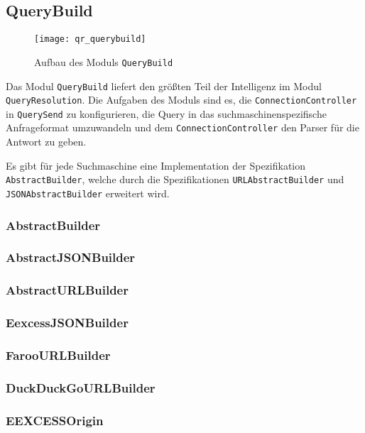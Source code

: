 
\subsection{QueryBuild}

\begin{figure}[htb]
  \texttt{[image: qr\_querybuild]}
  \caption{Aufbau des Moduls \lstinline|QueryBuild|}
\end{figure}

Das Modul \lstinline|QueryBuild| liefert den größten Teil der Intelligenz im Modul \lstinline|QueryResolution|. Die Aufgaben des Moduls sind es, die \lstinline|ConnectionController| in \lstinline|QuerySend| zu konfigurieren, die Query in das suchmaschinenspezifische Anfrageformat umzuwandeln und dem \lstinline|ConnectionController| den Parser für die Antwort zu geben.

Es gibt für jede Suchmaschine eine Implementation der Spezifikation \lstinline|AbstractBuilder|, welche durch die Spezifikationen \lstinline|URLAbstractBuilder| und \lstinline|JSONAbstractBuilder| erweitert wird.

\subsubsection{AbstractBuilder}
\subsubsection{AbstractJSONBuilder}
\subsubsection{AbstractURLBuilder}
\subsubsection{EexcessJSONBuilder}
\subsubsection{FarooURLBuilder}
\subsubsection{DuckDuckGoURLBuilder}
\subsubsection{EEXCESSOrigin}

